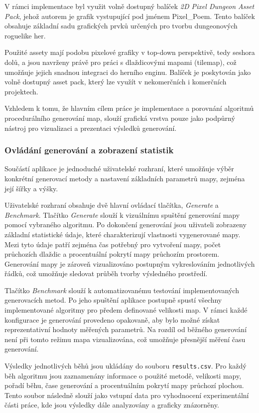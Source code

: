 \documentclass[
  program=itk,
  biblatex,
  figures=false,
  glossaries,
  index
]{kidiplom}
\begin{document}
V rámci implementace byl využit volně dostupný balíček \textit{2D Pixel Dungeon Asset Pack}, jehož autorem je grafik vystupující pod jménem Pixel\_Poem. Tento balíček obsahuje základní sadu grafických prvků určených pro tvorbu dungeonových roguelike her.

Použité assety mají podobu pixelové grafiky v top-down perspektivě, tedy seshora dolů, a jsou navrženy právě pro práci s dlaždicovými mapami (tilemap), což umožňuje jejich snadnou integraci do herního enginu. Balíček je poskytován jako volně dostupný asset pack, který lze využít v nekomerčních i komerčních projektech.

Vzhledem k tomu, že hlavním cílem práce je implementace a porovnání algoritmů procedurálního generování map, slouží grafická vrstva pouze jako podpůrný nástroj pro vizualizaci a prezentaci výsledků generování.

\subsubsection{Ovládání generování a zobrazení statistik}

Součástí aplikace je jednoduché uživatelské rozhraní, které umožňuje výběr konkrétní generovací metody a nastavení základních parametrů mapy, zejména její šířky a výšky.

Uživatelské rozhraní obsahuje dvě hlavní ovládací tlačítka, \textit{Generate} a \textit{Benchmark}. Tlačítko \textit{Generate} slouží k vizuálnímu spuštění generování mapy pomocí vybraného algoritmu. Po dokončení generování jsou uživateli zobrazeny základní statistické údaje, které charakterizují vlastnosti vygenerované mapy. Mezi tyto údaje patří zejména čas potřebný pro vytvoření mapy, počet průchozích dlaždic a procentuální pokrytí mapy průchozím prostorem. Generování mapy je zároveň vizualizováno postupným vykreslováním jednotlivých řádků, což umožňuje sledovat průběh tvorby výsledného prostředí.

Tlačítko \textit{Benchmark} slouží k automatizovanému testování implementovaných generovacích metod. Po jeho spuštění aplikace postupně spustí všechny implementované algoritmy pro předem definované velikosti map. V rámci každé konfigurace je generování provedeno opakovaně, aby bylo možné získat reprezentativní hodnoty měřených parametrů. Na rozdíl od běžného generování není při tomto režimu mapa vizualizována, což umožňuje přesnější měření času generování.

Výsledky jednotlivých běhů jsou ukládány do souboru \texttt{results.csv}. Pro každý běh algoritmu jsou zaznamenány informace o použité metodě, velikosti mapy, pořadí běhu, čase generování a procentuálním pokrytí mapy průchozí plochou. Tento soubor následně slouží jako vstupní data pro vyhodnocení experimentální části práce, kde jsou výsledky dále analyzovány a graficky znázorněny.
\end{document}
